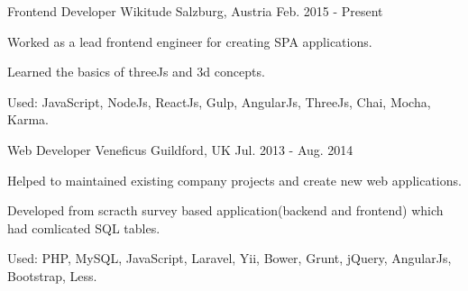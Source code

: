 

\begin{cventries}

  \cventry
    {Frontend Developer} %
    {Wikitude} %
    {Salzburg, Austria} %
    {Feb. 2015 - Present} %
    {
      \begin{cvitems} %
        \item {Worked as a lead frontend engineer for creating SPA applications.}
        \item {Learned the basics of threeJs and 3d concepts.}
        \item {Used: JavaScript, NodeJs, ReactJs, Gulp, AngularJs, ThreeJs, Chai, Mocha, Karma.}
      \end{cvitems}
    }

  \cventry
    {Web Developer} %
    {Veneficus} %
    {Guildford, UK} %
    {Jul. 2013 - Aug. 2014} %
    {
      \begin{cvitems} %
        \item {Helped to maintained existing company projects and create new web applications.}
        \item {Developed from scracth survey based application(backend and frontend) which had comlicated SQL tables.}
        \item {Used: PHP, MySQL, JavaScript, Laravel, Yii, Bower, Grunt, jQuery, AngularJs, Bootstrap, Less.}
      \end{cvitems}
    }

\end{cventries}
